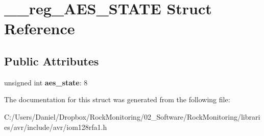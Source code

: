 \hypertarget{struct____reg___a_e_s___s_t_a_t_e}{}\section{\+\_\+\+\_\+reg\+\_\+\+A\+E\+S\+\_\+\+S\+T\+A\+TE Struct Reference}
\label{struct____reg___a_e_s___s_t_a_t_e}
\subsection*{Public Attributes}
\begin{DoxyCompactItemize}
\item 
unsigned int {\bfseries aes\+\_\+state}\+: 8\hypertarget{struct____reg___a_e_s___s_t_a_t_e_a62abca5f5b7e1502a0e1bf851a8168b4}{}\label{struct____reg___a_e_s___s_t_a_t_e_a62abca5f5b7e1502a0e1bf851a8168b4}

\end{DoxyCompactItemize}


The documentation for this struct was generated from the following file\+:\begin{DoxyCompactItemize}
\item 
C\+:/\+Users/\+Daniel/\+Dropbox/\+Rock\+Monitoring/02\+\_\+\+Software/\+Rock\+Monitoring/libraries/avr/include/avr/iom128rfa1.\+h\end{DoxyCompactItemize}
